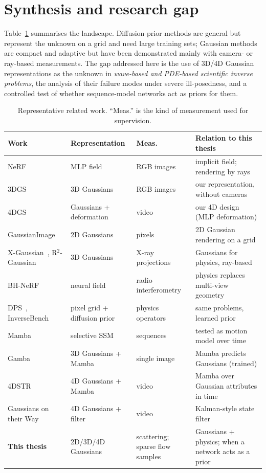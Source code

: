 \section{Synthesis and research gap}
Table~\ref{tab:lit} summarises the landscape. Diffusion-prior methods are general but represent the unknown on a
grid and need large training sets; Gaussian methods are compact and adaptive but have been demonstrated mainly with
camera- or ray-based measurements. The gap addressed here is the use of 3D/4D Gaussian representations as the unknown
in \emph{wave-based and PDE-based scientific inverse problems}, the analysis of their failure modes under severe
ill-posedness, and a controlled test of whether sequence-model networks act as priors for them.

\begin{table}[t]
  \centering
  \small
  \caption{Representative related work. ``Meas.'' is the kind of measurement used for supervision.}
  \label{tab:lit}
  \begin{tabular}{p{3.6cm}p{2.6cm}p{2.7cm}p{4.6cm}}
    \toprule
    Work & Representation & Meas. & Relation to this thesis \\
    \midrule
    NeRF~\citep{mildenhall2020nerf} & MLP field & RGB images & implicit field; rendering by rays \\
    3DGS~\citep{kerbl20233dgs} & 3D Gaussians & RGB images & our representation, without cameras \\
    4DGS~\citep{wu20244dgs} & Gaussians + deformation & video & our 4D design (MLP deformation) \\
    GaussianImage~\citep{zhang2024gaussianimage} & 2D Gaussians & pixels & 2D Gaussian rendering on a grid \\
    X-Gaussian~\citep{cai2024xgaussian}, R$^2$-Gaussian~\citep{zha2024r2gaussian} & 3D Gaussians & X-ray projections & Gaussians for physics, ray-based \\
    BH-NeRF~\citep{levis2022bhnerf} & neural field & radio interferometry & physics replaces multi-view geometry \\
    DPS~\citep{chung2023dps}, InverseBench~\citep{zheng2025inversebench} & pixel grid + diffusion prior & physics operators & same problems, learned prior \\
    Mamba~\citep{gu2023mamba} & selective SSM & sequences & tested as motion model over time \\
    Gamba~\citep{shen2025gamba} & 3D Gaussians + Mamba & single image & Mamba predicts Gaussians (trained) \\
    4DSTR~\citep{liu2026fourdstr} & 4D Gaussians + Mamba & video & Mamba over Gaussian attributes in time \\
    Gaussians on their Way~\citep{deng2024gaussiansontheirway} & 4D Gaussians + filter & video & Kalman-style state filter \\
    \textbf{This thesis} & 2D/3D/4D Gaussians & scattering; sparse flow samples & Gaussians + physics; when a network acts as a prior \\
    \bottomrule
  \end{tabular}
\end{table}
